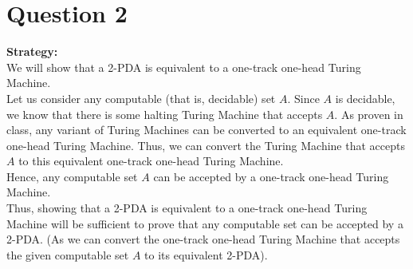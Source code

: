 \documentclass[12pt,a4paper]{article}
\begin{document}
\section{Question 2}
\textbf{Strategy:}
\\We will show that a 2-PDA is equivalent to a one-track one-head Turing Machine. 
\\Let us consider any computable (that is, decidable) set $A$. Since $A$ is decidable, we know that there is some halting Turing Machine that accepts $A$. As proven in class, any variant of Turing Machines can be converted to an equivalent one-track one-head Turing Machine. Thus, we can convert the Turing Machine that accepts $A$ to this equivalent one-track one-head Turing Machine.
\\Hence, any computable set $A$ can be accepted by a one-track one-head Turing Machine.
\\Thus, showing that a 2-PDA is equivalent to a one-track one-head Turing Machine will be sufficient to prove that any computable set can be accepted by a 2-PDA. (As we can convert the one-track one-head Turing Machine that accepts the given computable set $A$ to its equivalent 2-PDA).
\\
\end{document}
